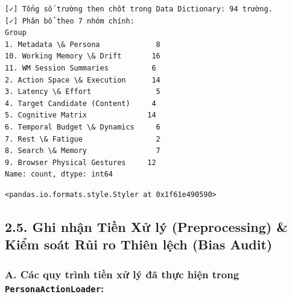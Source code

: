 \documentclass[11pt]{article}
\makeatletter
\newcommand{\boxspacing}{\kern\kvtcb@left@rule\kern\kvtcb@boxsep}
\newcommand{\prompt}[4]{
        {\ttfamily\llap{{\color{#2}[#3]:\hspace{3pt}#4}}\vspace{-\baselineskip}}
    }
\makeatother
\begin{document}
    \begin{Verbatim}[commandchars=\\\{\}]
[✓] Tổng số trường then chốt trong Data Dictionary: 94 trường.
[✓] Phân bổ theo 7 nhóm chính:
Group
1. Metadata \& Persona             8
10. Working Memory \& Drift       16
11. WM Session Summaries          6
2. Action Space \& Execution      14
3. Latency \& Effort               5
4. Target Candidate (Content)     4
5. Cognitive Matrix              14
6. Temporal Budget \& Dynamics     6
7. Rest \& Fatigue                 2
8. Search \& Memory                7
9. Browser Physical Gestures     12
Name: count, dtype: int64
    \end{Verbatim}

            \begin{tcolorbox}[breakable, size=fbox, boxrule=.5pt, pad at break*=1mm, opacityfill=0]
\prompt{Out}{outcolor}{3}{\boxspacing}
\begin{Verbatim}[commandchars=\\\{\}]
<pandas.io.formats.style.Styler at 0x1f61e490590>
\end{Verbatim}
\end{tcolorbox}
        
    \subsection{2.5. Ghi nhận Tiền Xử lý (Preprocessing) \& Kiểm soát Rủi ro
Thiên lệch (Bias
Audit)}\label{ghi-nhux1eadn-tiux1ec1n-xux1eed-luxfd-preprocessing-kiux1ec3m-souxe1t-rux1ee7i-ro-thiuxean-lux1ec7ch-bias-audit}

\subsubsection{\texorpdfstring{A. Các quy trình tiền xử lý đã thực hiện
trong
\texttt{PersonaActionLoader}:}{A. Các quy trình tiền xử lý đã thực hiện trong PersonaActionLoader:}}\label{a.-cuxe1c-quy-truxecnh-tiux1ec1n-xux1eed-luxfd-ux111uxe3-thux1ef1c-hiux1ec7n-trong-personaactionloader}
\end{document}
